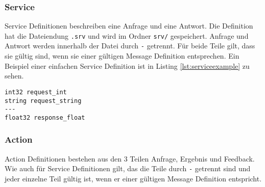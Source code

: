 \subsubsection{Service}
Service Definitionen beschreiben eine Anfrage und eine Antwort. Die Definition hat die Dateiendung \verb|.srv| und wird  im Ordner \verb|srv/| gespeichert. Anfrage und Antwort werden innerhalb der Datei durch \verb|-| getrennt. Für beide Teile gilt, dass sie gültig sind, wenn sie einer gültigen Message Definition entsprechen. Ein Beispiel einer einfachen Service Definition ist in Listing \ref{lst:serviceexample} zu sehen.\\
\begin{minipage}{\linewidth}%
\begin{lstlisting}[caption={Beispiel einer Service Definition}, label={lst:serviceexample}]
int32 request_int
string request_string
---
float32 response_float
\end{lstlisting}
\end{minipage}
\subsubsection{Action}
Action Definitionen bestehen aus den 3 Teilen Anfrage, Ergebnis und Feedback. Wie auch für Service Definitionen gilt, das die Teile durch \verb|-| getrennt sind und jeder einzelne Teil gültig ist, wenn er einer gültigen Message Definition entspricht. 
